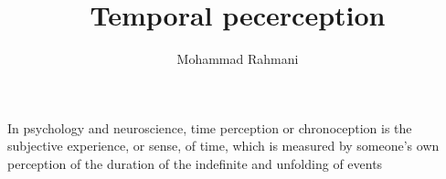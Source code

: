 \documentclass[a4paper]{article}
\title{Temporal pecerception}
\date{}
\author{Mohammad Rahmani}
\begin{document}
    \maketitle
    In psychology and neuroscience, time perception or chronoception is the subjective experience, or sense, of time, which is measured by someone's own perception of the duration of the indefinite and unfolding of events 
    
    
\end{document}
